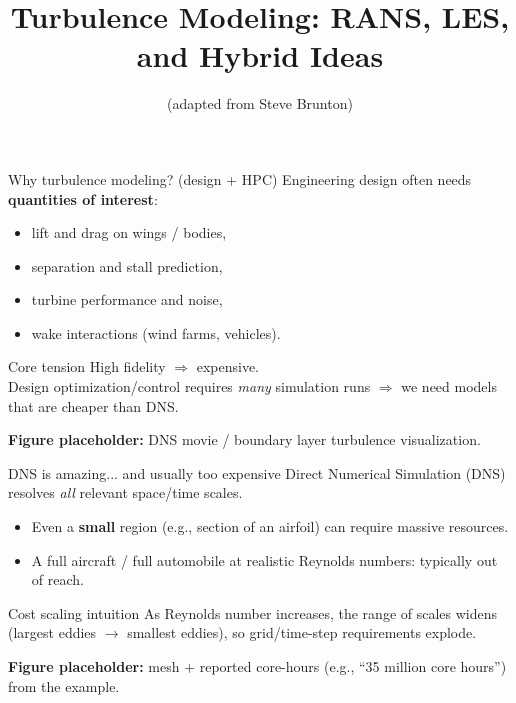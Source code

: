 \documentclass[aspectratio=169]{beamer}
\title[Turbulence Modeling]{Turbulence Modeling: RANS, LES, and Hybrid Ideas}
\author{(adapted from Steve Brunton)}
\date{}
\begin{document}
\begin{frame}
  \titlepage
\end{frame}

\begin{frame}{Why turbulence modeling? (design + HPC)}
Engineering design often needs \textbf{quantities of interest}:
\begin{itemize}
  \item lift and drag on wings / bodies,
  \item separation and stall prediction,
  \item turbine performance and noise,
  \item wake interactions (wind farms, vehicles).
\end{itemize}

\begin{block}{Core tension}
High fidelity $\Rightarrow$ expensive. \\
Design optimization/control requires \emph{many} simulation runs $\Rightarrow$ we need models that are cheaper than DNS.
\end{block}

\vspace{1em}
\textbf{Figure placeholder:} DNS movie / boundary layer turbulence visualization.
\end{frame}

\begin{frame}{DNS is amazing... and usually too expensive}
Direct Numerical Simulation (DNS) resolves \emph{all} relevant space/time scales.

\begin{itemize}
  \item Even a \textbf{small} region (e.g., section of an airfoil) can require massive resources.
  \item A full aircraft / full automobile at realistic Reynolds numbers: typically out of reach.
\end{itemize}

\begin{block}{Cost scaling intuition}
As Reynolds number increases, the range of scales widens (largest eddies $\to$ smallest eddies), so grid/time-step requirements explode.
\end{block}

\textbf{Figure placeholder:} mesh + reported core-hours (e.g., ``35 million core hours'') from the example.
\end{frame}
\end{document}
